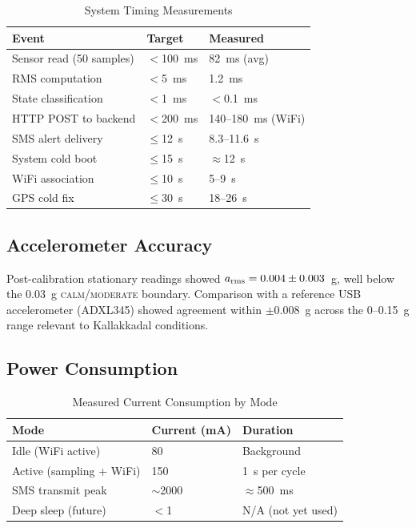 \begin{table}[H]
\centering
\caption{System Timing Measurements}
\label{tab:timing}
\begin{tabular}{lll}
\toprule
\textbf{Event}             & \textbf{Target}    & \textbf{Measured} \\
\midrule
Sensor read (50 samples)   & $<$100~ms          & 82~ms (avg) \\
RMS computation            & $<$5~ms            & 1.2~ms \\
State classification       & $<$1~ms            & $<$0.1~ms \\
HTTP POST to backend       & $<$200~ms          & 140--180~ms (WiFi) \\
SMS alert delivery         & $\leq$12~s         & 8.3--11.6~s \\
System cold boot           & $\leq$15~s         & $\approx$12~s \\
WiFi association           & $\leq$10~s         & 5--9~s \\
GPS cold fix               & $\leq$30~s         & 18--26~s \\
\bottomrule
\end{tabular}
\end{table}

\subsection{Accelerometer Accuracy}

Post-calibration stationary readings showed $a_{\rm rms} = 0.004 \pm 0.003$~g,
well below the 0.03~g \textsc{calm/moderate} boundary.
Comparison with a reference USB accelerometer (ADXL345) showed agreement within
$\pm$0.008~g across the $0$--0.15~g range relevant to Kallakkadal conditions.

\subsection{Power Consumption}

\begin{table}[H]
\centering
\caption{Measured Current Consumption by Mode}
\label{tab:power}
\begin{tabular}{lll}
\toprule
\textbf{Mode}           & \textbf{Current (mA)} & \textbf{Duration} \\
\midrule
Idle (WiFi active)      & 80                    & Background \\
Active (sampling + WiFi)& 150                   & 1~s per cycle \\
SMS transmit peak       & $\sim$2000            & $\approx$500~ms \\
Deep sleep (future)     & $<$1                  & N/A (not yet used) \\
\bottomrule
\end{tabular}
\end{table}

